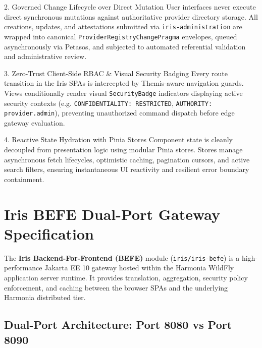 \begin{principlebox}{2. Governed Change Lifecycle over Direct Mutation}
User interfaces never execute direct synchronous mutations against authoritative provider directory storage. All creations, updates, and attestations submitted via \texttt{iris-administration} are wrapped into canonical \texttt{ProviderRegistryChangePragma} envelopes, queued asynchronously via Petasos, and subjected to automated referential validation and administrative review.
\end{principlebox}

\begin{principlebox}{3. Zero-Trust Client-Side RBAC \& Visual Security Badging}
Every route transition in the Iris SPAs is intercepted by Themis-aware navigation guards. Views conditionally render visual \texttt{SecurityBadge} indicators displaying active security contexts (e.g. \texttt{CONFIDENTIALITY: RESTRICTED}, \texttt{AUTHORITY: provider.admin}), preventing unauthorized command dispatch before edge gateway evaluation.
\end{principlebox}

\begin{principlebox}{4. Reactive State Hydration with Pinia Stores}
Component state is cleanly decoupled from presentation logic using modular Pinia stores. Stores manage asynchronous fetch lifecycles, optimistic caching, pagination cursors, and active search filters, ensuring instantaneous UI reactivity and resilient error boundary containment.
\end{principlebox}

\section{Iris BEFE Dual-Port Gateway Specification}
\label{sec:iris_befe_spec}

The \textbf{Iris Backend-For-Frontend (BEFE)} module (\texttt{iris/iris-befe}) is a high-performance Jakarta EE 10 gateway hosted within the Harmonia WildFly application server runtime. It provides translation, aggregation, security policy enforcement, and caching between the browser SPAs and the underlying Harmonia distributed tier.

\subsection{Dual-Port Architecture: Port 8080 vs Port 8090}

